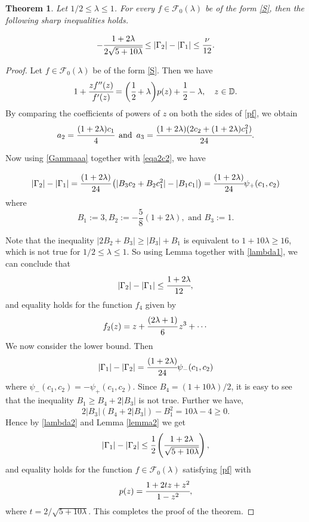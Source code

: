 \documentclass[a4paper,12pt]{amsart}
\newtheorem{theorem}{Theorem}[section]
\theoremstyle{definition}
\numberwithin{equation}{section}
\begin{document}
 \begin{theorem}\label{2}
Let $1/2\le \lambda\le 1$. For every $f\in \mathcal{F}_0(\lambda)$ be of the form \eqref{S}, then the following sharp inequalities holds.

\begin{equation}
-\cfrac{1+2\lambda}{2\sqrt{5+10\lambda}} \leq |\Gamma_2|-|\Gamma_1| \leq \frac{\nu}{12}.
\end{equation}

\end{theorem}

\begin{proof}

Let  $f\in \mathcal{F}_0(\lambda)$ be of the form \eqref{S}. Then we have
	\begin{equation}\label{pf}
	1+\cfrac{zf''(z)}{f'(z)}=\bigg(\cfrac{1}{2}+\lambda\bigg)p(z)+\cfrac{1}{2}-\lambda, \quad z\in \mathbb{D}.
	\end{equation}
	By comparing the coefficients of powers of $z$ on both the sides of \eqref{pf}, we obtain
\begin{equation}\label{eqa2c2}
	a_2=\cfrac{(1+2\lambda)c_1}{4} \,\,\, \text{and} \,\,\,
    a_3=\cfrac{(1+2\lambda)(2c_2+(1+2\lambda)c_1^2)}{24}.
\end{equation}



\noindent Now using \eqref{Gammaaa} together with \eqref{eqa2c2}, we have 

\begin{equation}\label{lambda1}
|\Gamma_2|-|\Gamma_1| = \cfrac{(1+2\lambda)}{24}\left(|B_3 c_2+B_2 c_1^2|-|B_1 c_1|\right)= \cfrac{(1+2\lambda)}{24}\psi_+(c_1,c_2)
\end{equation}
where  
$$
	B_1:=3, B_2:=-\frac{5}{8}(1+2\lambda), \mbox{ and } B_3:=1.
$$

\noindent Note that the inequality $|2B_2+B_3| \geq |B_3|+B_1$ is equivalent to $1+10\lambda \geq 16$, which is not true for $1/2 \leq \lambda \leq 1$. So using Lemma together with \eqref{lambda1}, we can conclude that 
$$|\Gamma_2|-|\Gamma_1| \leq \cfrac{1+2\lambda}{12},$$
and equality holds for the function $f_4$ given by
 \begin{equation}\label{f2}
 	f_2(z)=z+\cfrac{(2\lambda+1)}{6}\,z^3+\cdots
 \end{equation}
\noindent We now consider the lower bound. Then
\begin{equation}\label{lambda2}
|\Gamma_1|-|\Gamma_2| = \cfrac{(1+2\lambda)}{24} \psi_-(c_1,c_2)
\end{equation}
where $\psi_-(c_1,c_2)=-\psi_+(c_1,c_2)$. Since $B_4=(1+10\lambda)/2$, it is easy to see that the inequality $B_1\geq B_4+2|B_3|$ is not true. Further we have,
$$
2|B_3|(B_4+2|B_3|)-B_1^2=10\lambda -4 \geq 0.
$$
Hence by \eqref{lambda2} and Lemma \ref{lemma2} we get 
$$
|\Gamma_1|-|\Gamma_2| \leq \cfrac{1}{2}\left(\cfrac{1+2\lambda}{\sqrt{5+10\lambda}}\right),
$$
and equality holds for the function $f \in \mathcal{F}_0(\lambda)$ satisfying \eqref{pf} with 
$$
p(z)=\cfrac{1+2tz+z^2}{1-z^2},
$$
where $t=2/\sqrt{5+10\lambda}$. This completes the proof of the theorem.
\end{proof}
\end{document}

